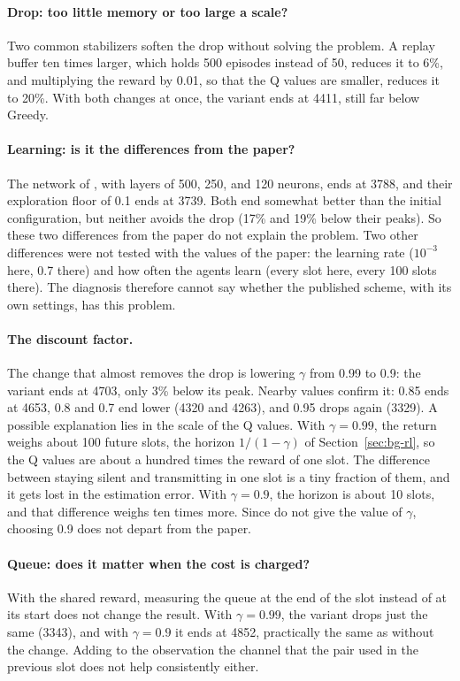 \paragraph{Drop: too little memory or too large a scale?}  Two common stabilizers soften the drop without
solving the problem. A replay buffer ten times larger, which holds 500 episodes instead of 50, reduces it to
6\%, and multiplying the reward by 0.01, so that the Q values are smaller, reduces it to 20\%. With both
changes at once, the variant ends at 4411, still far below Greedy.

\paragraph{Learning: is it the differences from the paper?}  The network of \citet{li+22fedmarl}, with layers
of 500, 250, and 120 neurons, ends at 3788, and their exploration floor of 0.1 ends at 3739. Both end
somewhat better than the initial configuration, but neither avoids the drop (17\% and 19\% below their
peaks). So these two differences from the paper do not explain the problem. Two other differences were not
tested with the values of the paper: the learning rate ($10^{-3}$ here, 0.7 there) and how often the agents
learn (every slot here, every 100 slots there). The diagnosis therefore cannot say whether the published
scheme, with its own settings, has this problem.

\paragraph{The discount factor.}  The change that almost removes the drop is lowering $\gamma$ from 0.99 to
0.9: the variant ends at 4703, only 3\% below its peak. Nearby values confirm it: 0.85 ends at 4653, 0.8 and
0.7 end lower (4320 and 4263), and 0.95 drops again (3329). A possible explanation lies in the scale of the
Q values. With $\gamma = 0.99$, the return weighs about 100 future slots, the horizon $1/(1-\gamma)$ of
Section~\ref{sec:bg-rl}, so the Q values are about a hundred times the reward of one slot. The difference
between staying silent and transmitting in one slot is a tiny fraction of them, and it gets lost in the
estimation error. With $\gamma = 0.9$, the horizon is about 10 slots, and that difference weighs ten times
more. Since \citet{li+22fedmarl} do not give the value of $\gamma$, choosing 0.9 does not depart from the
paper.

\paragraph{Queue: does it matter when the cost is charged?}  With the shared reward, measuring the queue at
the end of the slot instead of at its start does not change the result. With $\gamma = 0.99$, the variant
drops just the same (3343), and with $\gamma = 0.9$ it ends at 4852, practically the same as without the
change. Adding to the observation the channel that the pair used in the previous slot does not help
consistently either.

